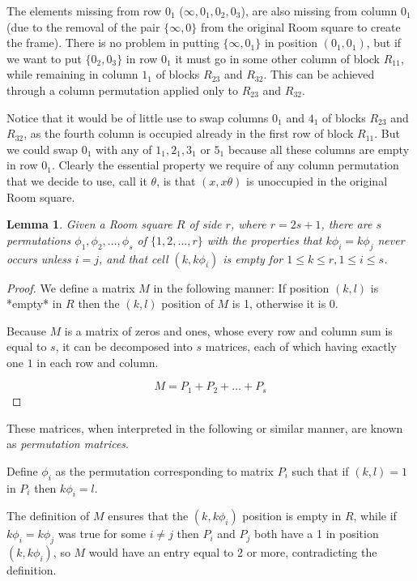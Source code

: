 \documentclass[
  11pt,
  a4paper]{book}
\newtheorem{lemma}[theorem]{Lemma}
\begin{document}
The elements missing from row \(0_1\) (\(\infty, 0_1, 0_2, 0_3\)),
are also missing from column \(0_1\) (due to the removal
of the pair \(\{\infty,0\}\) from the original Room square to
create the frame). There is no problem in putting
\(\{\infty,0_1\}\) in position \((0_1,0_1)\), but if we want to
put \(\{0_2,0_3\}\) in row \(0_1\) it must go in some other
column of block \(R_{11}\), while remaining in column \(1_1\) of
blocks \(R_{23}\) and \(R_{32}\). This can be achieved through a
column permutation applied only to \(R_{23}\) and \(R_{32}\).

Notice that it would be of little use to swap columns \(0_1\)
and \(4_1\) of blocks \(R_{23}\) and \(R_{32}\), as the fourth
column is occupied already in the first row of block
\(R_{11}\). But we could swap \(0_1\) with any of \(1_1,2_1,3_1\)
or \(5_1\) because all these columns are empty in row \(0_1\).
Clearly the essential property we require of any column
permutation that we decide to use, call it \(\theta\), is that
\((x,x\theta)\) is unoccupied in the original Room square.

\begin{lemma}
Given a Room square $R$ of side $r$, where $r=2s+1$, there
are $s$ permutations $\phi_1,\phi_2,...,\phi_s$ of
$\{1,2,...,r\}$ with the properties that $k\phi_i=k\phi_j$
never occurs unless $i=j$, and that cell $(k,k\phi_i)$ is
empty for $1 \leq k \leq r, 1 \leq i\leq s$.
\end{lemma}

\begin{proof}
We define a matrix $M$ in the following manner: If position
$(k,l)$ is *empty* in $R$ then the $(k,l)$ position of $M$
is 1, otherwise it is 0.

Because $M$ is a matrix of zeros and ones, whose every row and
column sum is equal to $s$, it can be decomposed into $s$
matrices, each of which having exactly one $1$ in each row
and column.

\begin{equation}
M = P_1 + P_2 + \ldots + P_s
\end{equation}
\end{proof}

These matrices, when interpreted in the following or similar
manner, are known as \emph{permutation matrices}.

Define \(\phi_i\) as the permutation corresponding to matrix
\(P_i\) such that if \((k,l) = 1\) in \(P_i\) then \(k\phi _i = l\).

The definition of \(M\) ensures that the \((k, k\phi _i)\)
position is empty in \(R\), while if \(k\phi_{i} = k\phi_{j}\)
was true for some \(i \neq j\) then \(P_i\) and \(P_j\) both have
a 1 in position \((k, k\phi_i)\), so \(M\) would have an entry
equal to 2 or more, contradicting the definition.
\end{document}
